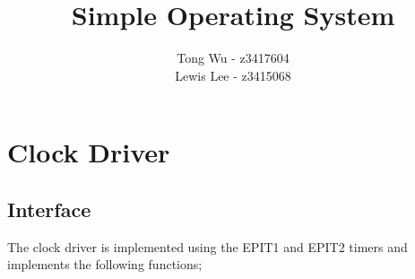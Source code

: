 \documentclass[12pt]{article}
\begin{document}
\pagestyle{myheadings}

\title{Simple Operating System}
\author{Tong Wu - z3417604\\Lewis Lee - z3415068}

\maketitle

\clearpage

\tableofcontents

\clearpage

\section{Clock Driver}
\subsection{Interface}
The clock driver is implemented using the EPIT1 and EPIT2 timers and implements the following functions;
\end{document}
